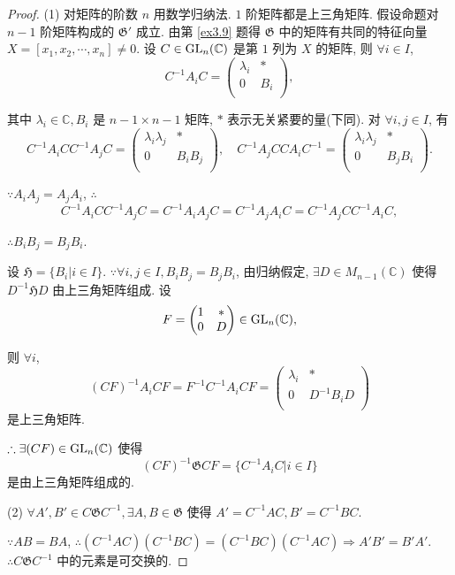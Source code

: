 \documentclass{ctexart}
\begin{document}
\begin{proof}
    (1) 对矩阵的阶数 $n$ 用数学归纳法. $1$ 阶矩阵都是上三角矩阵. 假设命题对 $n-1$ 阶矩阵构成的 $\mathfrak{G}'$ 成立. 由第 \ref{ex3.9} 题得 $\mathfrak{G}$ 中的矩阵有共同的特征向量 $X=[x_1,x_2,\cdots,x_n]\neq0$. 设 $C\in\operatorname{GL} _n(\mathbb{C})$ 是第 $1$ 列为 $X$ 的矩阵, 则 $\forall i\in I$,
    \[C^{-1}A_iC=\begin{pmatrix}
        \lambda_i & * \\
        0 & B_i \\
    \end{pmatrix},\]

    其中 $\lambda_i\in\mathbb{C},B_i$ 是 $n-1\times n-1$ 矩阵, $*$ 表示无关紧要的量(下同). 对 $\forall i,j\in I$, 有
    \[C^{-1}A_iCC^{-1}A_jC=\begin{pmatrix}
        \lambda_i\lambda_j & * \\
        0 & B_iB_j \\
    \end{pmatrix},\quad C^{-1}A_jCCA_iC^{-1}=\begin{pmatrix}
        \lambda_i\lambda_j & * \\
        0 & B_jB_i \\
    \end{pmatrix}.\]

    $\because A_iA_j=A_jA_i$, $\therefore$
    \[C^{-1}A_iCC^{-1}A_jC=C^{-1}A_iA_jC=C^{-1}A_jA_iC=C^{-1}A_jCC^{-1}A_iC,\]

    $\therefore B_iB_j=B_jB_i$.

    设 $\mathfrak{H}=\{B_i|i\in I\}$. $\because\forall i,j\in I,B_iB_j=B_jB_i$, 由归纳假定, $\exists D\in M_{n-1}(\mathbb{C})$ 使得 $D^{-1}\mathfrak{H}D$ 由上三角矩阵组成. 设
    \[F=\begin{pmatrix}
        1 & * \\
        0 & D \\
    \end{pmatrix}\in\operatorname{GL} _n(\mathbb{C}),\]

    则 $\forall i$,
    \[(CF)^{-1}A_iCF=F^{-1}C^{-1}A_iCF=\begin{pmatrix}
        \lambda_i & * \\
        0 & D^{-1}B_iD \\
    \end{pmatrix}\]
    是上三角矩阵.

    $\therefore\exists(CF)\in\operatorname{GL} _n(\mathbb{C})$ 使得
    \[(CF)^{-1}\mathfrak{G}CF=\{C^{-1}A_iC|i\in I\}\]
    是由上三角矩阵组成的.

    (2) $\forall A',B'\in C\mathfrak{G}C^{-1},\exists A,B\in\mathfrak{G}$ 使得 $A'=C^{-1}AC,B'=C^{-1}BC$.
    
    $\because AB=BA$, $\therefore(C^{-1}AC)(C^{-1}BC)=(C^{-1}BC)(C^{-1}AC)\Rightarrow A'B'=B'A'$. $\therefore C\mathfrak{G}C^{-1}$ 中的元素是可交换的.
\end{proof}
\end{document}
